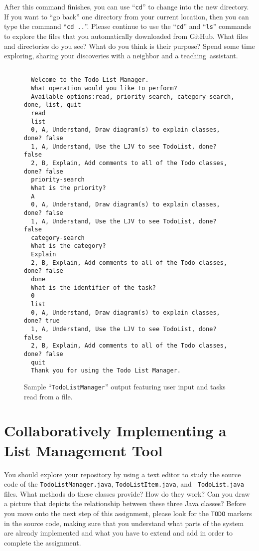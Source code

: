 \documentclass[11pt]{article}
\newcommand{\command}[1]{``\lstinline{#1}''}
\newcommand{\program}[1]{\lstinline{#1}}
\newcommand{\step}[1]{``{#1}''}
\begin{document}
After this command finishes, you can use \command{cd} to change into the new
directory. If you want to \step{go back} one directory from your current
location, then you can type the command \command{cd ..}. Please continue to use
the \command{cd} and \command{ls} commands to explore the files that you
automatically downloaded from GitHub. What files and directories do you see?
What do you think is their purpose? Spend some time exploring, sharing your
discoveries with a neighbor and a \mbox{teaching assistant}.

\begin{figure}[tb]
  \begin{Verbatim}[commandchars=\\\{\}]

  Welcome to the Todo List Manager.
  What operation would you like to perform?
  Available options:read, priority-search, category-search, done, list, quit
  read
  list
  0, A, Understand, Draw diagram(s) to explain classes, done? false
  1, A, Understand, Use the LJV to see TodoList, done? false
  2, B, Explain, Add comments to all of the Todo classes, done? false
  priority-search
  What is the priority?
  A
  0, A, Understand, Draw diagram(s) to explain classes, done? false
  1, A, Understand, Use the LJV to see TodoList, done? false
  category-search
  What is the category?
  Explain
  2, B, Explain, Add comments to all of the Todo classes, done? false
  done
  What is the identifier of the task?
  0
  list
  0, A, Understand, Draw diagram(s) to explain classes, done? true
  1, A, Understand, Use the LJV to see TodoList, done? false
  2, B, Explain, Add comments to all of the Todo classes, done? false
  quit
  Thank you for using the Todo List Manager.
\end{Verbatim}
\vspace*{-.1in}
\caption{Sample ``{\tt TodoListManager}'' output featuring user input and tasks read from a file.}
\label{fig:output}
\end{figure}

\section*{Collaboratively Implementing a List Management Tool}

You should explore your repository by using a text editor to study the source
code of the {\tt TodoListManager.java}, {\tt TodoListItem.java}, and {\tt
TodoList.java} files. What methods do these classes provide? How do they work?
Can you draw a picture that depicts the relationship between these three Java
classes? Before you move onto the next step of this assignment, please look for
the \program{TODO} markers in the source code, making sure that you understand
what parts of the system are already implemented and what you have to extend and
add in order to complete the assignment.
\end{document}

